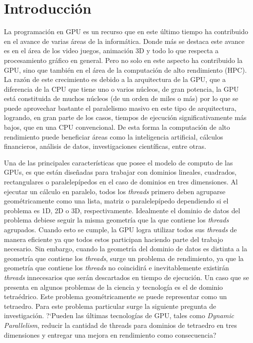 \documentclass[10pt, conference, compsocconf, onecolumn]{IEEEtran}
\begin{document}
\section{Introducci\'on}
\label{sec_introduccion}


La programaci\'on en GPU es un recurso que en este \'ultimo tiempo ha contribuido en el avance de varias \'areas de la inform\'atica. Donde m\'as se destaca este avance es en el \'area de los video juegos, animaci\'on 3D y todo lo que respecta a procesamiento gr\'afico en general. Pero no solo en este aspecto ha contribuido la GPU, sino que tambi\'en en el \'area de la computaci\'on de alto rendimiento (HPC). La raz\'on de este crecimiento es debido a la arquitectura de la GPU, que a diferencia de la CPU que tiene uno o varios n\'ucleos, de gran potencia, la GPU est\'a constituida de muchos n\'ucleos (de un orden de miles o m\'as) por lo que se puede aprovechar bastante el paralelismo masivo en este tipo de arquitectura, logrando, en gran parte de los casos, tiempos de ejecuci\'on significativamente m\'as bajos, que en una CPU convencional. De esta forma la computaci\'on de alto rendimiento puede beneficiar \'areas como la inteligencia artificial, c\'alculos financieros, an\'alisis de datos, investigaciones cient\'ificas, entre otras.

Una de las principales caracter\'isticas que posee el  modelo de computo de las GPUs, es que est\'an dise\~nadas para trabajar con dominios lineales, cuadrados, rectangulares o paralelep\'ipedos en el caso de dominios en tres dimensiones. Al ejecutar un c\'alculo en paralelo, todos los \textit{threads} primero deben agruparse geom\'etricamente como una lista, matriz o paralelep\'ipedo dependiendo si el problema es  1D, 2D o 3D, respectivamente. Idealmente el dominio de datos del problema debiese seguir la misma geometr\'ia que la que contiene los \textit{threads} agrupados. Cuando esto se cumple, la GPU logra utilizar todos sus \textit{threads} de manera eficiente ya que todos estos participan haciendo parte del trabajo necesario. Sin embargo, cuando la geometr\'ia del dominio de datos es distinta a la geometr\'ia que contiene los \textit{threads}, surge un problema de rendimiento, ya que la geometr\'ia que contiene los \textit{threads} no coincidir\'a e inevitablemente existir\'an \textit{threads} innecesarios que ser\'an descartados en tiempo de ejecuci\'on. Un caso que se presenta en algunos problemas de la ciencia y tecnolog\'ia es el de dominio tetra\'edrico. Este problema geom\'etricamente se puede representar como un tetraedro. Para este problema particular surge la siguiente pregunta de investigaci\'on. ?`Pueden las \'ultimas tecnolog\'ias de GPU, tales como \textit{Dynamic Parallelism}, reducir la cantidad de threads para dominios de tetraedro en tres dimensiones y entregar una mejora en rendimiento como consecuencia?
\end{document}
